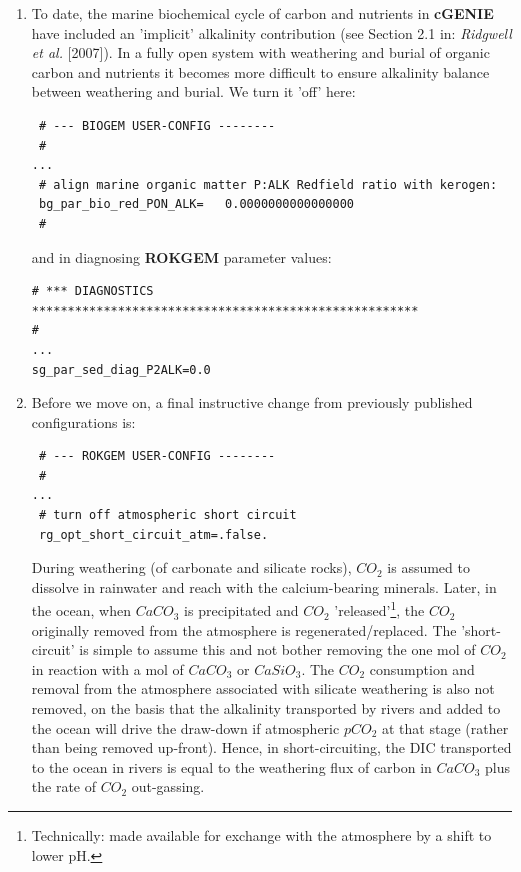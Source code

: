 \begin{enumerate}[noitemsep]
\vspace{1mm}
\item To date, the marine biochemical cycle of carbon and nutrients in \textbf{cGENIE} have included an 'implicit' alkalinity contribution (see Section 2.1 in: \textit{Ridgwell et al.} [2007]). In a fully open system with weathering and burial of organic carbon and nutrients it becomes more difficult to ensure alkalinity balance between weathering and burial. We turn it 'off' here:
\vspace{-0mm}\footnotesize\begin{verbatim}
 # --- BIOGEM USER-CONFIG --------
 #
...
 # align marine organic matter P:ALK Redfield ratio with kerogen:
 bg_par_bio_red_PON_ALK=   0.0000000000000000     
 #
\end{verbatim}\normalsize\vspace{-1mm}
and in diagnosing \textbf{ROKGEM} parameter values:
\vspace{-0mm}\footnotesize\begin{verbatim}
# *** DIAGNOSTICS ******************************************************
#
...    
sg_par_sed_diag_P2ALK=0.0
\end{verbatim}\normalsize\vspace{-1mm}

\newpage

\item Before we move on, a final instructive change from previously published configurations is:
\vspace{-0mm}\small\begin{verbatim}
 # --- ROKGEM USER-CONFIG --------
 #
...
 # turn off atmospheric short circuit
 rg_opt_short_circuit_atm=.false.
\end{verbatim}\normalsize\vspace{-1mm}
During weathering (of carbonate and silicate rocks), \(CO_{2}\) is assumed to dissolve in rainwater and reach with the calcium-bearing minerals. Later, in the ocean, when \(CaCO_{3}\) is precipitated and \(CO_{2}\) 'released'\footnote{Technically: made available for exchange with the atmosphere by a shift to lower pH.}, the \(CO_{2}\) originally removed from the atmosphere is regenerated/replaced. The 'short-circuit' is simple to assume this and not bother removing the one mol of \(CO_{2}\) in reaction with a mol of \(CaCO_{3}\) or \(CaSiO_{3}\). The \(CO_{2}\) consumption and removal from the atmosphere associated with silicate weathering is also not removed, on the basis that the alkalinity transported by rivers and added to the ocean will drive the draw-down if atmospheric \(pCO_{2}\) at that stage (rather than being removed up-front). Hence, in short-circuiting, the DIC transported to the ocean in rivers is equal to the weathering flux of carbon in \(CaCO_{3}\) plus the rate of \(CO_{2}\) out-gassing.


\end{enumerate}
